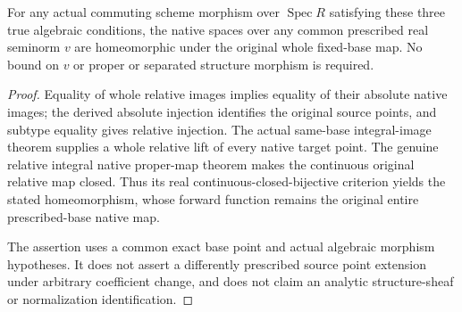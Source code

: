 \begin{theorem}
\label{scheme:relative-native-universal-homeomorphism}
\leanok
{}
For any actual commuting scheme morphism over $\operatorname{Spec}R$
satisfying these three true algebraic conditions, the native spaces
over any common prescribed real seminorm $v$ are homeomorphic under
the original whole fixed-base map. No bound on $v$ or proper or
separated structure morphism is required.
\end{theorem}
\begin{proof}
Equality of whole relative images implies equality of their absolute
native images; the derived absolute injection identifies the original
source points, and subtype equality gives relative injection. The
actual same-base integral-image theorem supplies a whole relative lift
of every native target point. The genuine relative integral native
proper-map theorem makes the continuous original relative map closed.
Thus its real continuous-closed-bijective criterion yields the stated
homeomorphism, whose forward function remains the original entire
prescribed-base native map.

The assertion uses a common exact base point and actual algebraic
morphism hypotheses. It does not assert a differently prescribed
source point extension under arbitrary coefficient change, and does
not claim an analytic structure-sheaf or normalization identification.
\end{proof}
